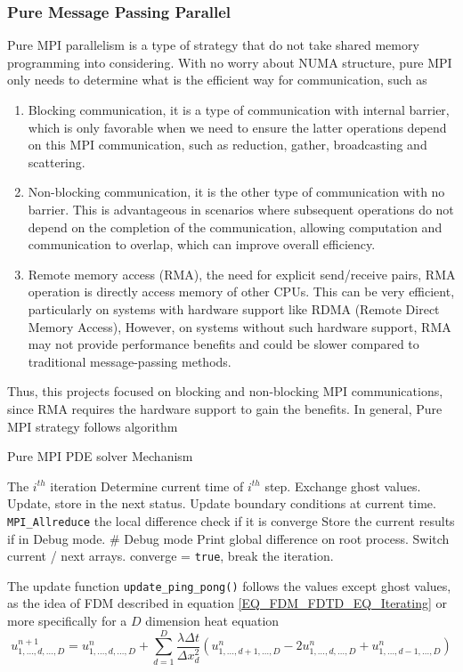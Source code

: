 \subsubsection{Pure Message Passing Parallel} \label{SEC:PURE_MPI}
Pure MPI parallelism is a type of strategy that do not take shared memory programming into considering.
With no worry about NUMA structure, pure MPI only needs to determine what is the efficient way for communication,
such as 
\begin{enumerate}
  \item Blocking communication, it is a type of communication with internal barrier, which is only favorable when we need to ensure the latter operations depend on this MPI communication,
  such as reduction, gather, broadcasting and scattering.
  \item Non-blocking communication, it is the other type of communication with no barrier. 
  This is advantageous in scenarios where subsequent operations do not depend on the completion of the communication, 
  allowing computation and communication to overlap, which can improve overall efficiency.
  \item Remote memory access (RMA), the need for explicit send/receive pairs, RMA operation is directly access memory of other CPUs.
  This can be very efficient, particularly on systems with hardware support like RDMA (Remote Direct Memory Access), 
  However, on systems without such hardware support, 
  RMA may not provide performance benefits and could be slower compared to traditional message-passing methods.
\end{enumerate}
Thus, this projects focused on blocking and non-blocking MPI communications, since RMA requires the hardware support to gain the benefits.
In general, Pure MPI strategy follows algorithm
\begin{algorithm}
  \caption{Pure MPI PDE solver Mechanism}
  \label{ALG:PURE_MPI}
  \begin{algorithmic}[1]
    \STATE The $i^{th}$ iteration 
    \STATE Determine current time of $i^{th}$ step.
    \STATE Exchange ghost values.
    \STATE Update, store in the next status.
    \STATE Update boundary conditions at current time.
    \STATE \texttt{MPI\_Allreduce} the local difference check if it is converge
      \STATE Store the current results if in Debug mode.  \hfill \# Debug mode
      \STATE Print global difference on root process.
    \ENDIF
    \STATE Switch current / next arrays.
      \STATE converge = \texttt{true}, break the iteration.
    \ENDIF
  \end{algorithmic}
\end{algorithm}
The update function \texttt{update\_ping\_pong()} follows the values except ghost values, as the idea of FDM described in equation \ref{EQ_FDM_FDTD_EQ_Iterating}
or more specifically for a $D$ dimension heat equation
\begin{equation}
  u^{n+1}_{1,\dots,d,\dots,D} = 
      u^{n}_{1, \dots,d, \dots,D}
    + \sum_{d=1}^{D}\frac{\lambda \Delta t}{\Delta x_d^2}
  \left(
      u^{n}_{1,\dots,d+1, \dots,D} 
    - 2u^{n}_{1,\dots,d, \dots,D} 
    + u^{n}_{1,\dots,d-1, \dots,D}
  \right)
\end{equation}

